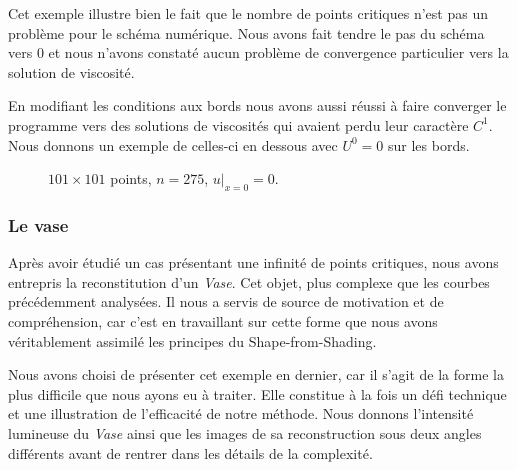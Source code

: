 Cet exemple illustre bien le fait que le nombre de points critiques n'est pas un problème pour le schéma numérique. 
Nous avons fait tendre le pas du schéma vers 0 et nous n'avons constaté aucun problème de convergence particulier vers la solution de viscosité. 
\begin{noremark}
    En modifiant les conditions aux bords nous avons aussi réussi à faire converger le programme vers des solutions de viscosités qui avaient perdu leur caractère $C^1$. Nous donnons un exemple de celles-ci en dessous avec $U^0=0$ sur les bords.
\end{noremark}
\vspace{10cm} %
\begin{figure}[htb]
    \centering
    \caption{$101\times 101$ points, $n=275$,  $\left. u\right|_{x=0}=0.$ }\label{Fig:x2_mixedbd}
\end{figure}


\subsubsection{Le vase}
Après avoir étudié un cas présentant une infinité de points critiques, nous avons entrepris la reconstitution d’un \textit{Vase}. Cet objet, plus complexe que les courbes précédemment analysées. Il nous a servis de source de motivation et de compréhension, car c’est en travaillant sur cette forme que nous avons véritablement assimilé les principes du Shape-from-Shading.

Nous avons choisi de présenter cet exemple en dernier, car il s’agit de la forme la plus difficile que nous ayons eu à traiter. Elle constitue à la fois un défi technique et une illustration de l’efficacité de notre méthode. Nous donnons l'intensité lumineuse du \textit{Vase} ainsi que les images de sa reconstruction sous deux angles différents avant de rentrer dans les détails de la complexité.

